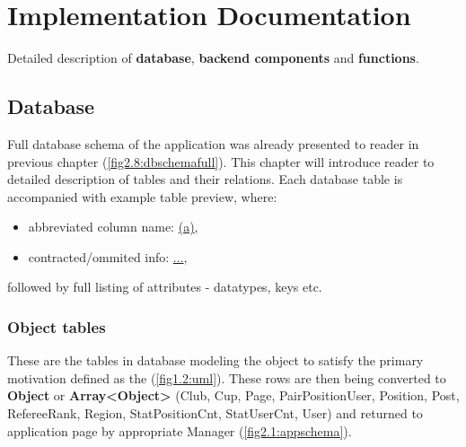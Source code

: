 \chapter{Implementation Documentation}
Detailed description of \textbf{database}, \textbf{backend components} and \textbf{functions}.  

\section{Database}
Full database schema of the application was already presented to reader in previous chapter (\autoref{fig2.8:dbschemafull}). This chapter will introduce reader to detailed description of tables and their relations.  
\newline
Each database table is accompanied with example table preview, where: 
\begin{itemize}
  \item abbreviated column name: \underline{(a)},
  \item contracted/ommited info: \underline{...},
\end{itemize}
followed by full listing of attributes - datatypes, keys etc.
\subsection{Object tables}
These are the tables in database modeling the object to satisfy the primary motivation defined as the (\autoref{fig1.2:uml}). These rows are then being converted to \textbf{Object} or \textbf{Array\textless Object\textgreater}  (Club, Cup, Page, PairPositionUser, Position, Post, RefereeRank, Region, StatPositionCnt, StatUserCnt, User) and returned to application page by appropriate Manager (\autoref{fig2.1:appschema}).
